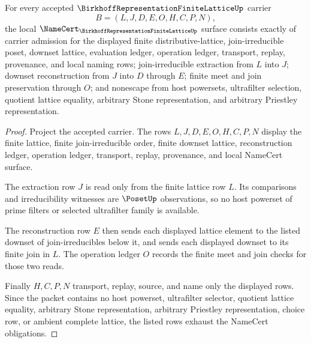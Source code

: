 \begin{theorem}
\label{thm:birkhoff-representation-finite-lattice-namecert-obligations}
For every accepted $\BirkhoffRepresentationFiniteLatticeUp$ carrier
$$
B=(L,J,D,E,O,H,C,P,N),
$$
the local $\NameCert_{\BirkhoffRepresentationFiniteLatticeUp}$ surface consists exactly of carrier admission for the displayed finite distributive-lattice, join-irreducible poset, downset lattice, evaluation ledger, operation ledger, transport, replay, provenance, and local naming rows; join-irreducible extraction from $L$ into $J$; downset reconstruction from $J$ into $D$ through $E$; finite meet and join preservation through $O$; and nonescape from host powersets, ultrafilter selection, quotient lattice equality, arbitrary Stone representation, and arbitrary Priestley representation.
\end{theorem}
\begin{proof}
Project the accepted carrier. The rows $L,J,D,E,O,H,C,P,N$ display the finite lattice, finite join-irreducible order, finite downset lattice, reconstruction ledger, operation ledger, transport, replay, provenance, and local NameCert surface.

The extraction row $J$ is read only from the finite lattice row $L$. Its comparisons and irreducibility witnesses are $\PosetUp$ observations, so no host powerset of prime filters or selected ultrafilter family is available.

The reconstruction row $E$ then sends each displayed lattice element to the listed downset of join-irreducibles below it, and sends each displayed downset to its finite join in $L$. The operation ledger $O$ records the finite meet and join checks for those two reads.

Finally $H,C,P,N$ transport, replay, source, and name only the displayed rows. Since the packet contains no host powerset, ultrafilter selector, quotient lattice equality, arbitrary Stone representation, arbitrary Priestley representation, choice row, or ambient complete lattice, the listed rows exhaust the NameCert obligations.
\end{proof}


